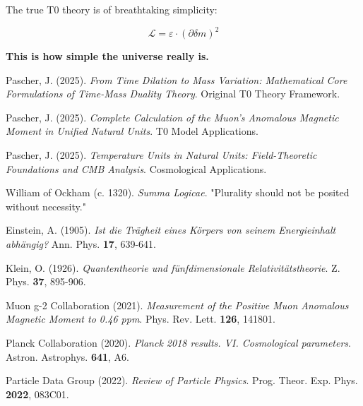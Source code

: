 \documentclass[12pt,a4paper]{article}
\newcommand{\deltam}{\delta m}
\newcommand{\Lag}{\mathcal{L}}
\theoremstyle{definition}
\theoremstyle{remark}
\begin{document}
	The true T0 theory is of breathtaking simplicity:
	
	\begin{equation}
		\boxed{\Lag = \varepsilon \cdot (\partial \deltam)^2}
	\end{equation}
	
	\textbf{This is how simple the universe really is.}
	
	\begin{thebibliography}{99}
		Pascher, J. (2025). \textit{From Time Dilation to Mass Variation: Mathematical Core Formulations of Time-Mass Duality Theory}. Original T0 Theory Framework.
		
		Pascher, J. (2025). \textit{Complete Calculation of the Muon's Anomalous Magnetic Moment in Unified Natural Units}. T0 Model Applications.
		
		Pascher, J. (2025). \textit{Temperature Units in Natural Units: Field-Theoretic Foundations and CMB Analysis}. Cosmological Applications.
		
		William of Ockham (c. 1320). \textit{Summa Logicae}. "Plurality should not be posited without necessity."
		
		Einstein, A. (1905). \textit{Ist die Trägheit eines Körpers von seinem Energieinhalt abhängig?} Ann. Phys. \textbf{17}, 639-641.
		
		Klein, O. (1926). \textit{Quantentheorie und fünfdimensionale Relativitätstheorie}. Z. Phys. \textbf{37}, 895-906.
		
		Muon g-2 Collaboration (2021). \textit{Measurement of the Positive Muon Anomalous Magnetic Moment to 0.46 ppm}. Phys. Rev. Lett. \textbf{126}, 141801.
		
		Planck Collaboration (2020). \textit{Planck 2018 results. VI. Cosmological parameters}. Astron. Astrophys. \textbf{641}, A6.
		
		Particle Data Group (2022). \textit{Review of Particle Physics}. Prog. Theor. Exp. Phys. \textbf{2022}, 083C01.
	\end{thebibliography}
	
\end{document}

